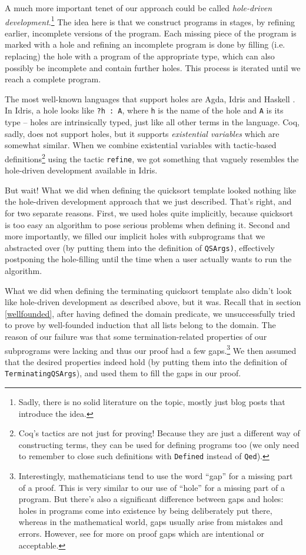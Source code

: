 \documentclass[declaration,mgr,english,shortabstract]{iithesis}
\newcommand{\m}[1]{\texttt{#1}}
\begin{document}
A much more important tenet of our approach could be called \textit{hole-driven development}.\footnote{Sadly, there is no solid literature on the topic, mostly just blog posts that introduce the idea.} The idea here is that we construct programs in stages, by refining earlier, incomplete versions of the program. Each missing piece of the program is marked with a hole and refining an incomplete program is done by filling (i.e. replacing) the hole with a program of the appropriate type, which can also possibly be incomplete and contain further holes. This process is iterated until we reach a complete program.

The most well-known languages that support holes are Agda, Idris and Haskell \cite{TypedHoles}. In Idris, a hole looks like \m{?h :\ A}, where \m{h} is the name of the hole and \m{A} is its type -- holes are intrinsically typed, just like all other terms in the language. Coq, sadly, does not support holes, but it supports \textit{existential variables} \cite{ExistentialVariables} which are somewhat similar. When we combine existential variables with tactic-based definitions\footnote{Coq's tactics are not just for proving! Because they are just a different way of constructing terms, they can be used for defining programs too (we only need to remember to close such definitions with \m{Defined} instead of \m{Qed}).} using the tactic \m{refine}, we got something that vaguely resembles the hole-driven development available in Idris.

But wait! What we did when defining the quicksort template looked nothing like the hole-driven development approach that we just described. That's right, and for two separate reasons. First, we used holes quite implicitly, because quicksort is too easy an algorithm to pose serious problems when defining it. Second and more importantly, we filled our implicit holes with subprograms that we abstracted over (by putting them into the definition of \m{QSArgs)}, effectively postponing the hole-filling until the time when a user actually wants to run the algorithm.

What we did when defining the terminating quicksort template also didn't look like hole-driven development as described above, but it was. Recall that in section \ref{wellfounded}, after having defined the domain predicate, we unsuccessfully tried to prove by well-founded induction that all lists belong to the domain. The reason of our failure was that some termination-related properties of our subprograms were lacking and thus our proof had a few gaps.\footnote{Interestingly, mathematicians tend to use the word ``gap'' for a missing part of a proof. This is very similar to our use of ``hole'' for a missing part of a program. But there's also a significant difference between gaps and holes: holes in programs come into existence by being deliberately put there, whereas in the mathematical world, gaps usually arise from mistakes and errors. However, see \cite{Gap1} \cite{Gap2} \cite{Gap3} for more on proof gaps which are intentional or acceptable.} We then assumed that the desired properties indeed hold (by putting them into the definition of \m{TerminatingQSArgs}), and used them to fill the gaps in our proof.
\end{document}

